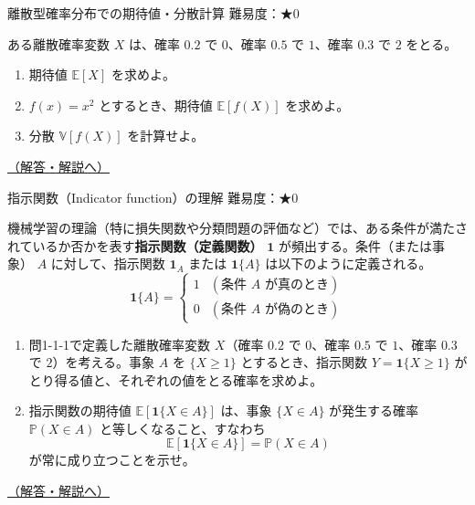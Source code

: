 \begin{questionbox}[label=q:1-1-1]{離散型確率分布での期待値・分散計算 \hfill \normalfont \small 難易度：★0}

ある離散確率変数 \(X\) は、確率 \(0.2\) で \(0\)、確率 \(0.5\) で
\(1\)、確率 \(0.3\) で \(2\) をとる。

\begin{enumerate}
\def\labelenumi{\arabic{enumi}.}
\tightlist
\item
  期待値 \(\mathbb{E}[X]\) を求めよ。
\item
  \(f(x) = x^2\) とするとき、期待値 \(\mathbb{E}[f(X)]\) を求めよ。
\item
  分散 \(\mathbb{V}[f(X)]\) を計算せよ。
\end{enumerate}

\hfill 

\hyperref[a:1-1-1]{（解答・解説へ）}

\end{questionbox}

\begin{questionbox}[label=q:1-1-2]{指示関数（Indicator function）の理解 \hfill \normalfont \small 難易度：★0}

機械学習の理論（特に損失関数や分類問題の評価など）では、ある条件が満たされているか否かを表す\textbf{指示関数（定義関数）}
\(\boldsymbol{1}\) が頻出する。条件（または事象） \(A\)
に対して、指示関数 \(\boldsymbol{1}_A\) または \(\boldsymbol{1}\{A\}\)
は以下のように定義される。 \[
\boldsymbol{1}\{A\} = \begin{cases}
1 & (\text{条件 } A \text{ が真のとき}) \\
0 & (\text{条件 } A \text{ が偽のとき})
\end{cases}
\]

\begin{enumerate}
\def\labelenumi{\arabic{enumi}.}
\tightlist
\item
  問1-1-1で定義した離散確率変数 \(X\)（確率 \(0.2\) で \(0\)、確率
  \(0.5\) で \(1\)、確率 \(0.3\) で \(2\)）を考える。事象 \(A\) を
  \(\{X \ge 1\}\) とするとき、指示関数 \(Y = \boldsymbol{1}\{X \ge 1\}\)
  がとり得る値と、それぞれの値をとる確率を求めよ。
\item
  指示関数の期待値 \(\mathbb{E}[\boldsymbol{1}\{X \in A\}]\) は、事象
  \(\{X \in A\}\) が発生する確率 \(\mathbb{P}(X \in A)\)
  と等しくなること、すなわち \[
  \mathbb{E}[\boldsymbol{1}\{X \in A\}] = \mathbb{P}(X \in A)
  \] が常に成り立つことを示せ。
\end{enumerate}

\hfill 

\hyperref[a:1-1-2]{（解答・解説へ）}

\end{questionbox}

